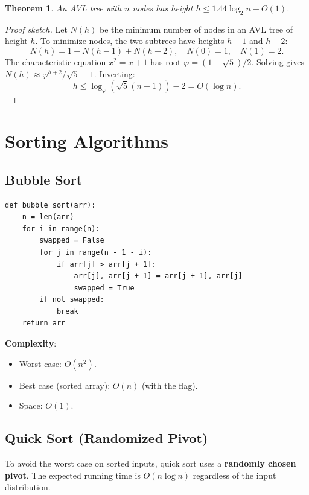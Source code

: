 \documentclass[11pt,a4paper]{article}
\newtheorem{theorem}{Theorem}[section]
\newcommand{\code}[1]{\texttt{\detokenize{#1}}}
\begin{document}
\begin{theorem}
An AVL tree with $n$ nodes has height $h \leq 1.44 \log_2 n + O(1)$.
\end{theorem}

\begin{proof}[Proof sketch]
Let $N(h)$ be the minimum number of nodes in an AVL tree of height $h$. To minimize nodes, the two subtrees have heights $h-1$ and $h-2$:
\[
N(h) = 1 + N(h-1) + N(h-2), \quad N(0) = 1, \quad N(1) = 2.
\]
The characteristic equation $x^2 = x + 1$ has root $\varphi = (1+\sqrt{5})/2$. Solving gives $N(h) \approx \varphi^{h+2}/\sqrt{5} - 1$. Inverting:
\[
h \leq \log_\varphi(\sqrt{5}(n+1)) - 2 = O(\log n).
\]
\end{proof}

\section{Sorting Algorithms}

\subsection{Bubble Sort}

\begin{lstlisting}
def bubble_sort(arr):
    n = len(arr)
    for i in range(n):
        swapped = False
        for j in range(n - 1 - i):
            if arr[j] > arr[j + 1]:
                arr[j], arr[j + 1] = arr[j + 1], arr[j]
                swapped = True
        if not swapped:
            break
    return arr
\end{lstlisting}

\textbf{Complexity}:
\begin{itemize}
    \item Worst case: $O(n^2)$.
    \item Best case (sorted array): $O(n)$ (with the \code{swapped} flag).
    \item Space: $O(1)$.
\end{itemize}

\subsection{Quick Sort (Randomized Pivot)}

To avoid the worst case on sorted inputs, quick sort uses a \textbf{randomly chosen pivot}. The expected running time is $O(n \log n)$ regardless of the input distribution.
\end{document}
